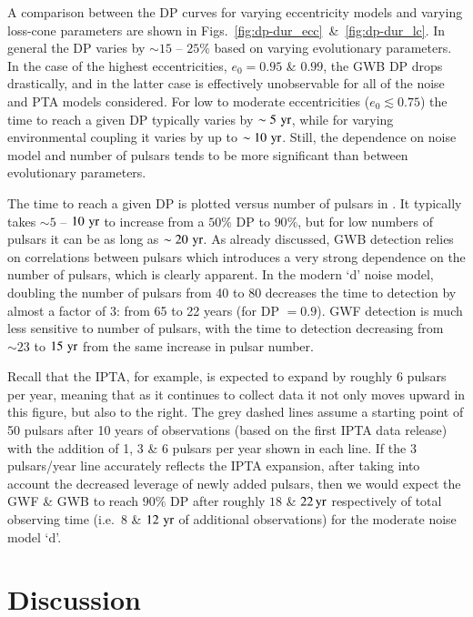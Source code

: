 \documentclass[useAMS, usenatbib]{mnras}  %
\newcommand{\eccinit}{e_0}
\begin{document}
        A comparison between the DP curves for varying eccentricity models and varying loss-cone parameters are shown in Figs.~\ref{fig:dp-dur_ecc}~\&~\ref{fig:dp-dur_lc}.  In general the DP varies by $\sim 15$ -- $25\%$ based on varying evolutionary parameters.  In the case of the highest eccentricities, $\eccinit = 0.95$ \& $0.99$, the GWB DP drops drastically, and in the latter case is effectively unobservable for all of the noise and PTA models considered.  For low to moderate eccentricities ($\eccinit \lesssim 0.75$) the time to reach a given DP typically varies by $\sim 5 \, \,\mathrm{yr}$, while for varying environmental coupling it varies by up to $\sim 10 \, \,\mathrm{yr}$.  Still, the dependence on noise model and number of pulsars tends to be more significant than between evolutionary parameters.

        The time to reach a given DP is plotted versus number of pulsars in .  It typically takes $\sim 5$ -- $10 \, \,\mathrm{yr}$ to increase from a $50\%$ DP to $90\%$, but for low numbers of pulsars it can be as long as $\sim 20 \, \,\mathrm{yr}$.  As already discussed, GWB detection relies on correlations between pulsars which introduces a very strong dependence on the number of pulsars, which is clearly apparent.  In the modern `d' noise model, doubling the number of pulsars from 40 to 80 decreases the time to detection by almost a factor of 3: from 65 to 22 years (for DP $ = 0.9$).  GWF detection is much less sensitive to number of pulsars, with the time to detection decreasing from $\sim 23$ to $15 \, \,\mathrm{yr}$ from the same increase in pulsar number.

        Recall that the IPTA, for example, is expected to expand by roughly 6 pulsars per year, meaning that as it continues to collect data it not only moves upward in this figure, but also to the right.  The grey dashed lines assume a starting point of 50 pulsars after 10 years of observations (based on the first IPTA data release) with the addition of 1, 3 \& 6 pulsars per year shown in each line.  If the 3 pulsars/year line accurately reflects the IPTA expansion, after taking into account the decreased leverage of newly added pulsars, then we would expect the GWF \& GWB to reach $90\%$ DP after roughly $18$ \& $22 \,\mathrm{yr}$ respectively of total observing time (i.e.~$8$ \& $12 \, \,\mathrm{yr}$ of additional observations) for the moderate noise model `d'.

\section{Discussion}
    \label{sec:discussion}
\end{document}
